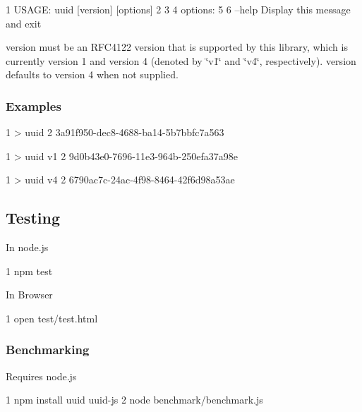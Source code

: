 \begin{DoxyCode}
1 USAGE: uuid [version] [options]
2 
3 
4 options:
5 
6 --help                     Display this message and exit
\end{DoxyCode}


{\ttfamily version} must be an R\+F\+C4122 version that is supported by this library, which is currently version 1 and version 4 (denoted by \char`\"{}v1\char`\"{} and \char`\"{}v4\char`\"{}, respectively). {\ttfamily version} defaults to version 4 when not supplied.

\subsubsection*{Examples}


\begin{DoxyCode}
1 > uuid
2 3a91f950-dec8-4688-ba14-5b7bbfc7a563
\end{DoxyCode}



\begin{DoxyCode}
1 > uuid v1
2 9d0b43e0-7696-11e3-964b-250efa37a98e
\end{DoxyCode}



\begin{DoxyCode}
1 > uuid v4
2 6790ac7c-24ac-4f98-8464-42f6d98a53ae
\end{DoxyCode}


\subsection*{Testing}

In node.\+js


\begin{DoxyCode}
1 npm test
\end{DoxyCode}


In Browser


\begin{DoxyCode}
1 open test/test.html
\end{DoxyCode}


\subsubsection*{Benchmarking}

Requires node.\+js


\begin{DoxyCode}
1 npm install uuid uuid-js
2 node benchmark/benchmark.js
\end{DoxyCode}


